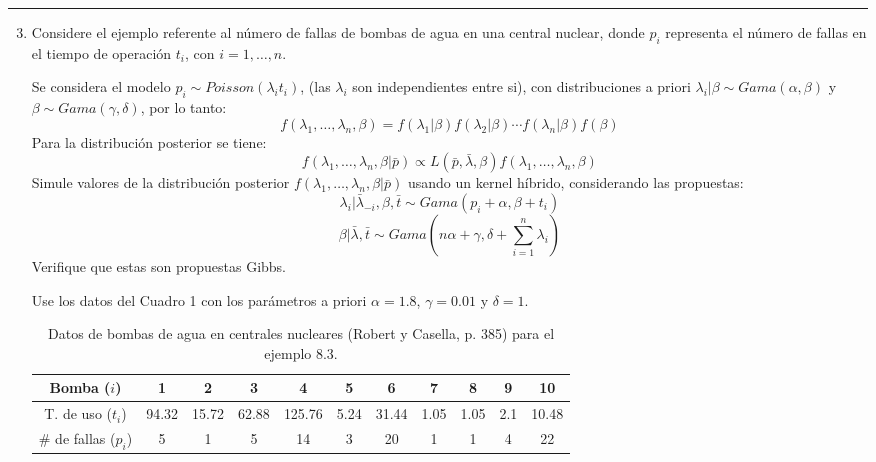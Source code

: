 \newpage
{\color{lightgray} \hrule}
\begin{enumerate} \setcounter{enumi}{2}
	\item Considere el ejemplo referente al número de fallas de bombas de agua en una central nuclear, donde $p_i$ representa el número de fallas en el tiempo de operación $t_i$, con $i= 1,\dots,n$.
	
	Se considera el modelo $p_i \sim Poisson(\lambda_i t_i)$, (las $\lambda_i$ son independientes entre si), con distribuciones a priori $\lambda_i|\beta \sim Gama(\alpha, \beta)$ y $\beta\sim Gama(\gamma,\delta)$, por lo tanto:
	\begin{equation} \label{eq:13}
		f(\lambda_1,\dots,\lambda_n,\beta) = f(\lambda_1|\beta) f(\lambda_2|\beta)\cdots f(\lambda_n|\beta) f(\beta)
	\end{equation}
	Para la distribución posterior se tiene:
	\begin{equation} \label{eq:14}
		f(\lambda_1,\dots,\lambda_n,\beta | \bar{p}) \propto L(\bar{p},\bar{\lambda},\beta) f(\lambda_1,\dots,\lambda_n,\beta)
	\end{equation}
	Simule valores de la distribución posterior $f(\lambda_1,\dots,\lambda_n,\beta | \bar{p})$ usando
	un kernel híbrido, considerando las propuestas:
	\begin{equation} \label{eq:15}
		\lambda_i | \bar{\lambda}_{-i}, \beta, \bar{t} \sim Gama(p_i+\alpha, \beta+t_i)
	\end{equation}
	\begin{equation} \label{eq:16}
		\beta | \bar{\lambda}, \bar{t} \sim Gama\left(n \alpha + \gamma, \delta+ \sum_{i=1}^{n} \lambda_i \right)
	\end{equation}
	Verifique que estas son propuestas Gibbs.
	
	Use los datos del Cuadro 1 con los parámetros a priori $\alpha= 1.8$, $\gamma = 0.01$ y $\delta= 1$.
	
	\begin{table}[h!]
		\centering
		\begin{tabular}{|c|c|c|c|c|c|c|c|c|c|c|}
			\hline
			Bomba ($i$) & 1 & 2 & 3 & 4 & 5 & 6 & 7 & 8 & 9 & 10 \\
			\hline
			T. de uso ($t_i$) & 94.32 & 15.72 & 62.88 & 125.76 & 5.24 & 31.44 & 1.05 & 1.05 & 2.1 & 10.48 \\
			\# de fallas ($p_i$) & 5 & 1 & 5 & 14 & 3 & 20 & 1 & 1 & 4 & 22 \\
			\hline
		\end{tabular}
		\caption{Datos de bombas de agua en centrales nucleares (Robert y Casella,
			p. 385) para el ejemplo 8.3.}
	\end{table}

\end{enumerate}

